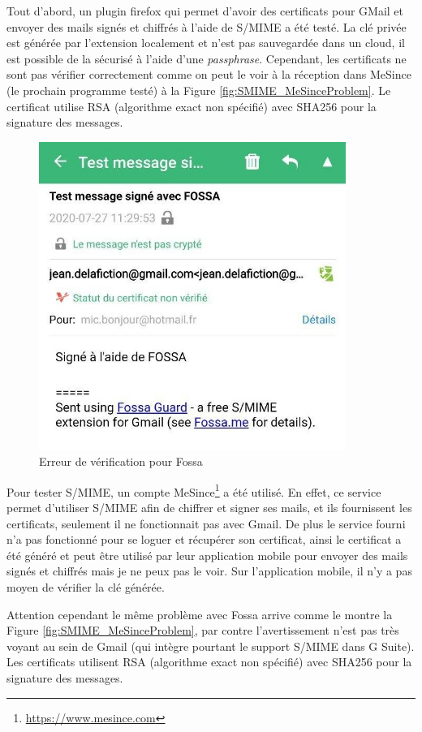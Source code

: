 Tout d'abord, un plugin firefox qui permet d'avoir des certificats pour GMail et envoyer des mails signés et chiffrés à l'aide de S/MIME a été testé. La clé privée est générée par l'extension localement et n'est pas sauvegardée dans un cloud, il est possible de la sécurisé à l'aide d'une \textit{passphrase}. Cependant, les certificats ne sont pas vérifier correctement comme on peut le voir à la réception dans MeSince (le prochain programme testé) à la Figure \ref{fig:SMIME_MeSinceProblem}. Le certificat utilise RSA (algorithme exact non spécifié) avec SHA256 pour la signature des messages.
\begin{figure}[h!]
	\includegraphics[width=10cm]{images/SMIME_FossaProblem.jpg}
	\centering
	\caption{Erreur de vérification pour Fossa}
	\label{fig:SMIME_FossaProblem}
\end{figure}

Pour tester S/MIME, un compte MeSince\footnote{\url{https://www.mesince.com}} a été utilisé. En effet, ce service permet d'utiliser S/MIME afin de chiffrer et signer ses mails, et ils fournissent les certificats, seulement il ne fonctionnait pas avec Gmail. De plus le service fourni n'a pas fonctionné pour se loguer et récupérer son certificat, ainsi le certificat a été généré et peut être utilisé par leur application mobile pour envoyer des mails signés et chiffrés mais je ne peux pas le voir. Sur l'application mobile, il n'y a pas moyen de vérifier la clé générée.

Attention cependant le même problème avec Fossa arrive comme le montre la Figure \ref{fig:SMIME_MeSinceProblem}, par contre l'avertissement n'est pas très voyant au sein de Gmail (qui intègre pourtant le support S/MIME dans G Suite). Les certificats utilisent RSA (algorithme exact non spécifié) avec SHA256 pour la signature des messages.

